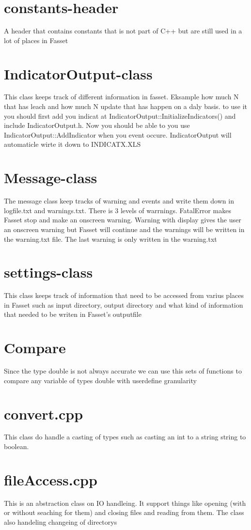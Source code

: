 \section{constants-header}
A header that contains constants that is not part of C++ but are still used in a lot of places in Fasset
\section{IndicatorOutput-class}
This class keeps track of different information in fasset. Eksample how much N that has leach and how much N update that has happen on a daly basis. to use it you should first add you indicat at  IndicatorOutput::InitializeIndicators() and include IndicatorOutput.h. Now you should be able to you use IndicatorOutput::AddIndicator when you event occure. IndicatorOutput will automaticle wirte it down to INDICATX.XLS
\section{Message-class}
The message class keep tracks of warning and events and write them down in logfile.txt and warnings.txt. There is 3 levels of warrnings. FatalError makes Fasset stop and make an onscreen warning. Warning with display gives the user an onscreen warning but Fasset will continue and the warnings will be written in the warning.txt file. The last warning is only written in the  warning.txt
\section{settings-class}
This class keeps track of information that need to be accessed from varius places in Fasset such as input directory, output directory and what kind of information that needed to be writen in Fasset's outputfile
\section{Compare}
Since the type double is not always accurate we can use this sets of functions to compare any variable of types double with userdefine granularity
\section{convert.cpp}
This class do handle a casting of types such as casting an int to a string string to boolean.
\section{fileAccess.cpp}
This is an abstraction class on IO handleing. It support things like opening (with or without seaching for them) and closing files and reading from them. The class also handeling changeing of directorys 